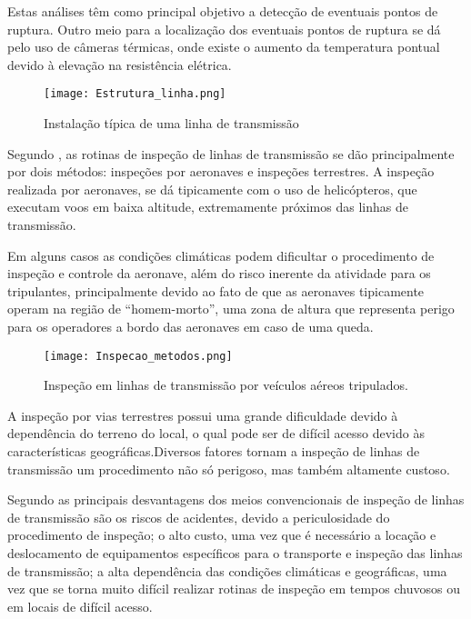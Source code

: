  Estas análises têm como principal objetivo a detecção de eventuais pontos de ruptura. Outro meio para a localização dos eventuais pontos de ruptura se dá pelo uso de câmeras térmicas, onde existe o aumento da temperatura pontual devido à elevação na resistência elétrica. 
 
 \begin{figure}[h!]												
 	\centering												
 	\texttt{[image: Estrutura\_linha.png]}			
 	\caption{Instalação típica de uma linha de transmissão}		
 	\label{img:Estrutura_Linha}	
 \end{figure}
 
 Segundo \cite{rangel2009sistema}, as rotinas de inspeção de linhas de transmissão se dão principalmente por dois métodos: inspeções por aeronaves e inspeções terrestres.
 A inspeção realizada por aeronaves, se dá tipicamente com o uso de helicópteros, que executam voos em baixa altitude, extremamente próximos das linhas de transmissão. 
 
 Em alguns casos as condições climáticas podem dificultar o procedimento de inspeção e controle da aeronave, além do risco inerente da atividade para os tripulantes, principalmente devido ao fato de que as aeronaves tipicamente operam na região de “homem-morto”, uma zona de altura que representa perigo para os operadores a bordo das aeronaves em caso de uma queda.
 
  \begin{figure}[h!]												
  	\centering												
  	\texttt{[image: Inspecao\_metodos.png]}			
  	\caption{Inspeção em linhas de transmissão por veículos aéreos tripulados.}		
  	\label{img:Inspecao_metodos}	
  \end{figure}
 
 A inspeção por vias terrestres possui uma grande dificuldade devido à dependência do terreno do local, o qual pode ser de difícil acesso devido às características geográficas.Diversos fatores tornam a inspeção de linhas de transmissão um procedimento não só perigoso, mas também altamente custoso. 
 
 Segundo \cite{cinematicajuliana} as principais desvantagens dos meios convencionais de inspeção de linhas de transmissão são os riscos de acidentes, devido a periculosidade do procedimento de inspeção; o alto custo, uma vez que é necessário a locação e deslocamento de equipamentos específicos para o transporte e inspeção das linhas de transmissão; a alta dependência das condições climáticas e geográficas, uma vez que se torna muito difícil realizar rotinas de inspeção em tempos chuvosos ou em locais de difícil acesso.
 
